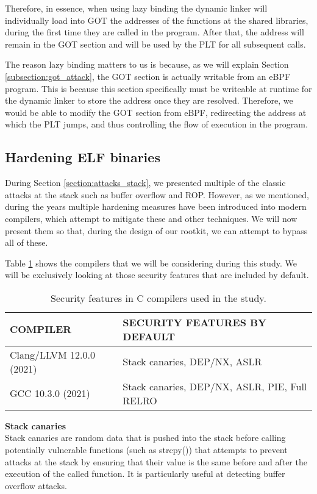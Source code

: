 Therefore, in essence, when using lazy binding the dynamic linker will individually load into GOT the addresses of the functions at the shared libraries, during the first time they are called in the program. After that, the address will remain in the GOT section and will be used by the PLT for all subsequent calls.

The reason lazy binding matters to us is because, as we will explain Section \ref{subsection:got_attack}, the GOT section is actually writable from an eBPF program. This is because this section specifically must be writeable at runtime for the dynamic linker to store the address once they are resolved. Therefore, we would be able to modify the GOT section from eBPF, redirecting the address at which the PLT jumps, and thus controlling the flow of execution in the program. 

\subsection{Hardening ELF binaries} \label{subsection:hardening_elf}
During Section \ref{section:attacks_stack}, we presented multiple of the classic attacks at the stack such as buffer overflow and ROP. However, as we mentioned, during the years multiple hardening measures have been introduced into modern compilers, which attempt to mitigate these and other techniques. We will now present them so that, during the design of our rootkit, we can attempt to bypass all of these.

Table \ref{table:compilers} shows the compilers that we will be considering during this study. We will be exclusively looking at those security features that are included by default.

\begin{table}[htbp]
\begin{tabular}{|>{\centering\arraybackslash}p{5cm}|>{\centering\arraybackslash}p{9cm}|}
\hline
\textbf{COMPILER} & \textbf{SECURITY FEATURES BY DEFAULT}\\
\hline
\hline
Clang/LLVM 12.0.0 (2021) & Stack canaries, DEP/NX, ASLR\\
\hline
GCC 10.3.0 (2021) & Stack canaries, DEP/NX, ASLR, PIE, Full RELRO\\
\hline 
\end{tabular}
\caption{Security features in C compilers used in the study.}
\label{table:compilers}
\end{table}

\textbf{Stack canaries}\\
Stack canaries are random data that is pushed into the stack before calling potentially vulnerable functions (such as strcpy()) that attempts to prevent attacks at the stack by ensuring that their value is the same before and after the execution of the called function. It is particularly useful at detecting buffer overflow attacks.

